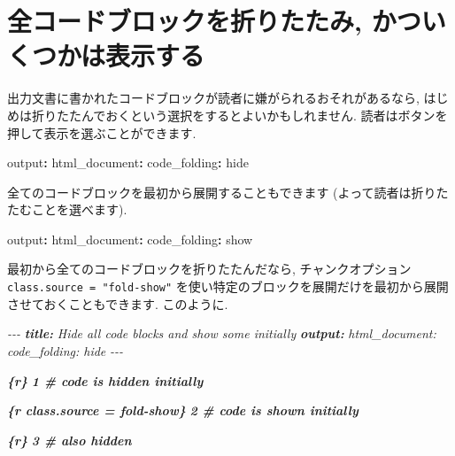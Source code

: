 \documentclass[
  11pt,
]{bxjsreport}
\newenvironment{Shaded}{\begin{snugshade}}{\end{snugshade}}
\newcommand{\AnnotationTok}[1]{\textcolor[rgb]{0.56,0.35,0.01}{\textbf{\textit{#1}}}}
\newcommand{\AttributeTok}[1]{\textcolor[rgb]{0.77,0.63,0.00}{#1}}
\newcommand{\CommentTok}[1]{\textcolor[rgb]{0.56,0.35,0.01}{\textit{#1}}}
\newcommand{\FunctionTok}[1]{\textcolor[rgb]{0.00,0.00,0.00}{#1}}
\newcommand{\InformationTok}[1]{\textcolor[rgb]{0.56,0.35,0.01}{\textbf{\textit{#1}}}}
\newcommand{\KeywordTok}[1]{\textcolor[rgb]{0.13,0.29,0.53}{\textbf{#1}}}
\begin{document}
\hypertarget{fold-show}{%
\section{全コードブロックを折りたたみ, かついくつかは表示する}\label{fold-show}}

出力文書に書かれたコードブロックが読者に嫌がられるおそれがあるなら, はじめは折りたたんでおくという選択をするとよいかもしれません. 読者はボタンを押して表示を選ぶことができます.

\begin{Shaded}
\begin{Highlighting}[]
\FunctionTok{output}\KeywordTok{:}
\AttributeTok{  }\FunctionTok{html\_document}\KeywordTok{:}
\AttributeTok{    }\FunctionTok{code\_folding}\KeywordTok{:}\AttributeTok{ hide}
\end{Highlighting}
\end{Shaded}

全てのコードブロックを最初から展開することもできます (よって読者は折りたたむことを選べます).

\begin{Shaded}
\begin{Highlighting}[]
\FunctionTok{output}\KeywordTok{:}
\AttributeTok{  }\FunctionTok{html\_document}\KeywordTok{:}
\AttributeTok{    }\FunctionTok{code\_folding}\KeywordTok{:}\AttributeTok{ show}
\end{Highlighting}
\end{Shaded}

最初から全てのコードブロックを折りたたんだなら, チャンクオプション \texttt{class.source = "fold-show"} を使い特定のブロックを展開だけを最初から展開させておくこともできます. このように.

\begin{Shaded}
\begin{Highlighting}[]
\CommentTok{{-}{-}{-}}
\AnnotationTok{title:}\CommentTok{ Hide all code blocks and show some initially}
\AnnotationTok{output:}
\CommentTok{  html\_document:}
\CommentTok{    code\_folding: hide}
\CommentTok{{-}{-}{-}}

\InformationTok{\textasciigrave{}\textasciigrave{}\textasciigrave{}\{r\}}
\InformationTok{1  \# code is hidden initially}
\InformationTok{\textasciigrave{}\textasciigrave{}\textasciigrave{}}

\InformationTok{\textasciigrave{}\textasciigrave{}\textasciigrave{}\{r class.source = \textquotesingle{}fold{-}show\textquotesingle{}\}}
\InformationTok{2  \# code is shown initially}
\InformationTok{\textasciigrave{}\textasciigrave{}\textasciigrave{}}

\InformationTok{\textasciigrave{}\textasciigrave{}\textasciigrave{}\{r\}}
\InformationTok{3  \# also hidden}
\InformationTok{\textasciigrave{}\textasciigrave{}\textasciigrave{}}
\end{Highlighting}
\end{Shaded}
\end{document}
